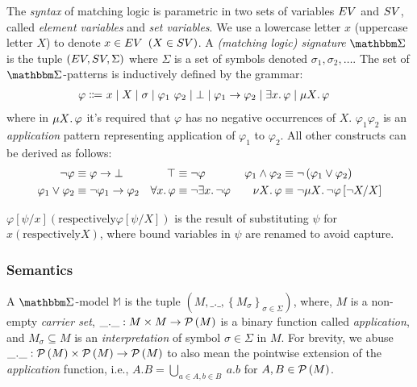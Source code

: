 The \emph{syntax} of matching logic is parametric in two sets of variables
$EV$ and $SV$, called \emph{element variables} and \emph{set variables}. We use
a lowercase letter $x$ (uppercase letter $X$) to denote $x \in EV$ $(X \in SV)$.
A \emph{(matching logic) signature} $\MLSigma$ is the tuple $\left(EV,SV, \Sigma\right)$
where $\Sigma$ is a set of symbols denoted $\sigma_1,\sigma_2,\dots$.
The set of $\MLSigma$-patterns is inductively defined by the grammar:
\begin{align*}
\varphi \Coloneqq\
& x
\mid X
\mid \sigma
\mid \varphi_1 \  \varphi_2
\mid \bot
\mid \varphi_1 \imp \varphi_2
\mid \exists x \ld \varphi
\mid \mu X \ld \varphi %
\end{align*}
where in $\mu X \mathord{.\,} \varphi$ it's required that $\varphi$ has no negative occurrences of $X$.
$\varphi_1\varphi_2$ is an \emph{application} pattern representing application
  of $\varphi_1$ to $\varphi_2$. All other constructs can be derived as follows:
\begin{align*}
  \neg \varphi &\equiv \varphi \to \bot & \top &\equiv \neg \varphi  & \varphi_1 \wedge \varphi_2 &\equiv \neg \left(\varphi_1 \vee \varphi_2 \right) \\
  \varphi_1 \vee \varphi_2 &\equiv \neg\varphi_1 \to \varphi_2 & \forall x \mathord{.\,} \varphi
  &\equiv \neg\exists x \mathord{.\,} \neg\varphi &\quad \nu X\mathord{.\,}\varphi &\equiv \neg \mu X \mathord{.\,}\neg\varphi\left[\neg X / X\right]
\end{align*}

$\varphi\left[\psi / x\right] (\text{respectively} \varphi\left[\psi / X\right])$ is the result of
substituting $\psi$ for $x (\text{respectively} X)$, where bound variables in
$\psi$ are renamed to avoid capture.

\subsubsection{Semantics}

A $\MLSigma$-model $\mathbb{M}$ is the tuple $\left(M, \_.\_,
\left\{M_{\sigma}\right\}_{\sigma \in \Sigma}\right)$, where,
$M$ is a non-empty \emph{carrier set}, $\_.\_: M \times M \to \mathcal{P}\left(M\right)$
is a binary function called \emph{application}, and $M_{\sigma} \subseteq M$ is an
\emph{interpretation} of symbol $\sigma \in \Sigma$ in $M$. For brevity, we
abuse  $\_.\_: \mathcal{P}\left(M\right) \times \mathcal{P}\left(M\right) \to \mathcal{P}\left(M\right)$ to also mean the pointwise extension of
the \emph{application} function, i.e., $A . B = \bigcup_{a \in A, b \in B}\ a.b$
for $A,B \in \mathcal{P}\left(M\right)$.

